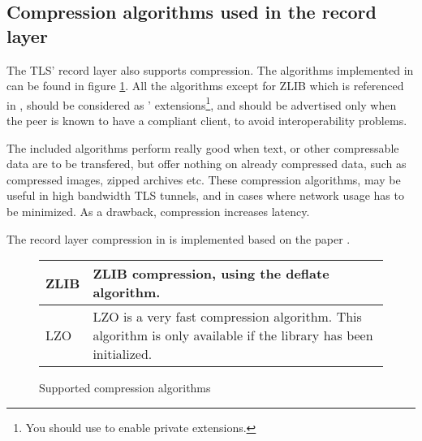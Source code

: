 \subsection*{Compression algorithms used in the record layer}
The TLS' record layer also supports compression. The algorithms
implemented in \gnutls{} can be found in figure \ref{fig:compression}.
All the algorithms except for ZLIB which is referenced in \cite{TLSCOMP}, should be 
considered as \gnutls' extensions\footnote{You should use 
to enable private extensions.}, and
should be advertised only when the peer is known to have a compliant client,
to avoid interoperability problems.
\par
The included algorithms perform really good when text, or other
compressable data are to be transfered, but offer nothing on already 
compressed data, such as compressed images, zipped archives etc.
These compression algorithms, may be useful in high bandwidth TLS tunnels,
and in cases where network usage has to be minimized. As a drawback, 
compression increases latency.

\par
The record layer compression in \gnutls{} is implemented based on
the paper \cite{TLSCOMP}.

\begin{figure}[hbtp]
\begin{tabular}{|l|p{9cm}|}

\hline
ZLIB & ZLIB compression, using the deflate algorithm.
\\
\hline
LZO & LZO is a very fast compression algorithm. This algorithm is only
available if the \gnutlse{} library has been initialized.
\\
\hline
\end{tabular}
\caption{Supported compression algorithms}
\label{fig:compression}
\end{figure}


